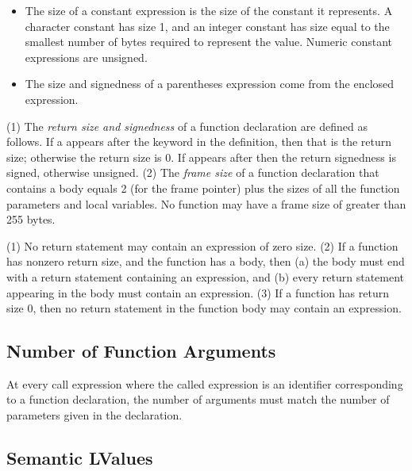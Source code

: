 \documentclass[10pt]{article}
\begin{document}
\begin{itemize}
  a unary operation expression come from the operand, except that (1)
  an address operation  is two bytes unsigned, and (2) a
  negation operation is signed.
%
\item {} The size of a constant expression is
  the size of the constant it represents.  A character constant has
  size 1, and an integer constant has size equal to the smallest
  number of bytes required to represent the value.  Numeric constant
  expressions are unsigned.
%
\item {} The size and signedness of a
  parentheses expression come from the enclosed expression.
%
\end{itemize}

 (1) The \emph{return size and
  signedness} of a function declaration are defined as follows.  If a
 appears after the keyword  in the definition,
then that is the return size; otherwise the return size is 0.  If
 appears after  then the return signedness is
signed, otherwise unsigned. (2) The \emph{frame size} of a function
declaration that contains a body equals 2 (for the frame pointer) plus
the sizes of all the function parameters and local variables.  No
function may have a frame size of greater than 255 bytes.

 (1) No return statement may contain an
expression of zero size.  (2) If a function has nonzero return size,
and the function has a body, then (a) the body must end with a return
statement containing an expression, and (b) every return statement
appearing in the body must contain an expression.  (3) If a function
has return size 0, then no return statement in the function body may
contain an expression.


\subsection{Number of Function Arguments}
\label{sec:semantics:fn-args}

At every call expression where the called expression is an identifier
corresponding to a function declaration, the number of arguments must
match the number of parameters given in the declaration.

\subsection{Semantic LValues}
\label{sec:semantics:lvalues}
\end{document}
